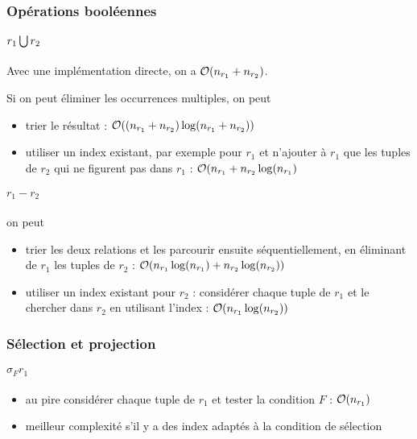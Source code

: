 		\subsubsection{Opérations booléennes}
		
		\paragraph{$r_1 \bigcup r_2$}
		
		Avec une implémentation directe, on a $\mathcal{O} (n_{r_1} + n_{r_2})$.
		
		Si on peut éliminer les occurrences multiples, on peut
		
		\begin{itemize}
			\item trier le résultat : $\mathcal{O} ((n_{r_1} + n_{r_2}) \log (n_{r_1} + n_{r_2}))$
			\item utiliser un index existant, par exemple pour $r_1$ et n'ajouter à $r_1$ que les tuples de $r_2$ qui ne figurent pas dans $r_1$ : $\mathcal{O} (n_{r_1} + n_{r_2} \log (n_{r_1})$
		\end{itemize}
		
		
		\paragraph{$r_1 - r_2$} on peut
		
		\begin{itemize}
			\item trier les deux relations et les parcourir ensuite séquentiellement, en éliminant de $r_1$ les tuples de $r_2$ : $\mathcal{O}(n_{r_1} \log (n_{r_1}) + n_{r_2} \log(n_{r_2}) ) $
			\item utiliser un index existant pour $r_2$ : considérer chaque tuple de $r_1$ et le chercher dans $r_2$ en utilisant l'index : $\mathcal{O} ( n_{r_1} \log (n_{r_2}))$
		\end{itemize}
		
		
		\subsubsection{Sélection et projection}
		
		\paragraph{$\sigma_Fr_1$}
		
		\begin{itemize}
			\item au pire considérer chaque tuple de $r_1$ et tester la condition $F$ : $\mathcal{O}(n_{r_1})$
			\item meilleur complexité s'il y a des index adaptés à la condition de sélection
		\end{itemize}
		
